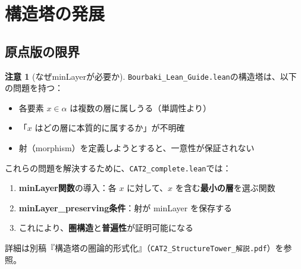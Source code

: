 \documentclass[a4paper,12pt]{ltjsarticle}
\theoremstyle{definition}
\newtheorem{remark}[theorem]{注意}
\begin{document}
\section{構造塔の発展}

\subsection{原点版の限界}

\begin{remark}[なぜminLayerが必要か]
\texttt{Bourbaki\_Lean\_Guide.lean}の構造塔は、以下の問題を持つ：

\begin{itemize}
\item 各要素 $x \in \alpha$ は複数の層に属しうる（単調性より）
\item 「$x$ はどの層に本質的に属するか」が不明確
\item 射（morphism）を定義しようとすると、一意性が保証されない
\end{itemize}
\end{remark}

\begin{evolution}
これらの問題を解決するために、\texttt{CAT2\_complete.lean}では：

\begin{enumerate}
\item \textbf{minLayer関数}の導入：各 $x$ に対して、$x$ を含む\textbf{最小の層}を選ぶ関数
\item \textbf{minLayer\_preserving条件}：射が minLayer を保存する
\item これにより、\textbf{圏構造}と\textbf{普遍性}が証明可能になる
\end{enumerate}

詳細は別稿『構造塔の圏論的形式化』（\texttt{CAT2\_StructureTower\_解説.pdf}）を参照。
\end{evolution}
\end{document}
